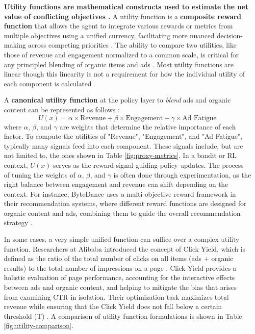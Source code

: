 \documentclass[final]{anthology-ch}         %
\begin{document}
\textbf{Utility functions are mathematical constructs used to estimate the net value of conflicting objectives \cite{Stigler1950}.} A utility function is a \textbf{composite reward function} that allows the agent to integrate various rewards or metrics from multiple objectives using a unified currency, facilitating more nuanced decision-making across competing priorities \cite{Stigler1950}. The ability to compare two utilities, like those of revenue and engagement normalized to a common scale, is critical for any principled blending of organic items and ads \cite{yan2020ads}.  Most utility functions are linear though this linearity is not a requirement for how the individual utility of each component is calculated \cite{wen2019learning, zhao2020jointly}. 

A \textbf{canonical utility function} at the policy layer to \textit{blend} ads and organic content can be represented as follows \cite{sagtani2024ad, yan2020ads, carrion2021blending}:
    \begin{equation}
        U(x) = \alpha \times \text{Revenue} + \beta \times \text{Engagement} - \gamma \times \text{Ad Fatigue}
    \end{equation}
    where $\alpha$, $\beta$, and $\gamma$ are weights that determine the relative importance of each factor. To compute the utilities of "Revenue", "Engagement", and "Ad Fatigue", typically many signals feed into each component. These signals include, but are not limited to, the ones shown in Table \ref{fig:proxy-metrics}. In a bandit or RL context, $U(x)$ serves as the reward signal guiding policy updates. The process of tuning the weights of $\alpha$, $\beta$, and $\gamma$ is often done through experimentation, as the right balance between engagement and revenue can shift depending on the context. For instance, ByteDance uses a multi-objective reward framework in their recommendation systems, where different reward functions are designed for organic content and ads, combining them to guide the overall recommendation strategy \cite{zhao2020jointly}.
    
In some cases, a very simple unified function can suffice over a complex utility function. Researchers at Alibaba introduced the concept of Click Yield, which is defined as the ratio of the total number of clicks on all items (ads + organic results) to the total number of impressions on a page \cite{zhang2018whole}. Click Yield provides a holistic evaluation of page performance, accounting for the interactive effects between ads and organic content, and helping to mitigate the bias that arises from examining CTR in isolation. Their optimization task maximizes total revenue while ensuring that the Click Yield does not fall below a certain threshold (T)  \cite{zhang2018whole}. A comparison of utility function formulations is shown in Table \ref{fig:utility-comparison}.
\end{document}
